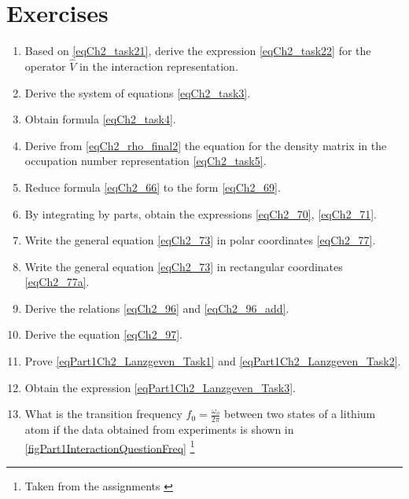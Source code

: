 \section{Exercises}
\begin{enumerate}
\item Based on \eqref{eqCh2_task21}, derive the expression
  \eqref{eqCh2_task22} for the operator $\hat{V}$ in the interaction representation.
\item Derive the system of equations \eqref{eqCh2_task3}.
\item Obtain formula \eqref{eqCh2_task4}.
\item Derive from \eqref{eqCh2_rho_final2} the equation for the density matrix in the occupation number representation \eqref{eqCh2_task5}.
\item Reduce formula \eqref{eqCh2_66} to the form \eqref{eqCh2_69}.
\item By integrating by parts, obtain the expressions \eqref{eqCh2_70}, \eqref{eqCh2_71}.
\item Write the general equation \eqref{eqCh2_73} in polar coordinates \eqref{eqCh2_77}.
\item Write the general equation \eqref{eqCh2_73} in rectangular coordinates \eqref{eqCh2_77a}.
\item Derive the relations \eqref{eqCh2_96} and \eqref{eqCh2_96_add}.
\item Derive the equation \eqref{eqCh2_97}.
\item Prove \eqref{eqPart1Ch2_Lanzgeven_Task1} and \eqref{eqPart1Ch2_Lanzgeven_Task2}.
\item Obtain the expression \eqref{eqPart1Ch2_Lanzgeven_Task3}.
\item \label{qInteractionFreq} What is the transition frequency $f_0 = \frac{\omega_o}{2 \pi}$ between two states of a lithium atom if the data obtained from experiments is shown in \autoref{figPart1InteractionQuestionFreq} \footnote{Taken from the assignments \cite{courseIntroQuantumOpticsCoursera}} 
\end{enumerate}

 